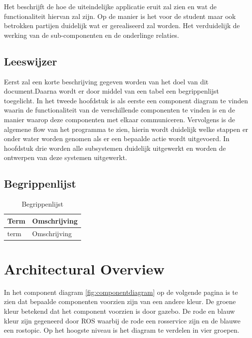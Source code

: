 \documentclass[a4paper, 11pt, oneside]{report}
\begin{document}
Het beschrijft de hoe de uiteindelijke applicatie eruit zal zien en wat de functionaliteit hiervan zal zijn. Op de manier is het voor de student maar ook betrokken partijen duidelijk wat er gerealiseerd zal worden. Het verduidelijk de werking van de sub-componenten en de onderlinge relaties. 

\section{Leeswijzer}
\label{inleiding:beschrijving:leeswijzer}
Eerst zal een korte beschrijving gegeven worden van het doel van dit document.Daarna wordt er door middel van een tabel een begrippenlijst toegelicht. In het tweede hoofdstuk is als eerste een component diagram te vinden waarin de functionaliteit van de verschillende componenten te vinden is en de manier waarop deze componenten met elkaar communiceren. Vervolgens is de algemene flow van het programma te zien, hierin wordt duidelijk welke stappen er onder water worden genomen als er een bepaalde actie wordt uitgevoerd. In hoofdstuk drie worden alle subsystemen duidelijk uitgewerkt en worden de ontwerpen van deze systemen uitgewerkt. 
\section{Begrippenlijst}
\label{inleiding:begrippenlijst}

\begin{table}[H]
\centering

\label{begrippen}
\begin{tabular}{|l|l|}
\hline
\rowcolor[HTML]{C0C0C0}
Term        & Omschrijving                                                         \\ \hline
term        & Omschrijving                                                      	\\ \hline

\end{tabular}
\caption{Begrippenlijst}
\end{table}

\chapter{Architectural Overview}
\label{architectural}
In het component diagram \autoref{fig:componentdiagram} op de volgende pagina is te zien dat bepaalde componenten voorzien zijn van een andere kleur. 
De groene kleur betekend dat het component voorzien is door gazebo.
De rode en blauw kleur zijn gegeneerd door ROS waarbij de rode een rosservice zijn en de blauwe een rostopic.
Op het hoogste niveau is het diagram te verdelen in vier groepen.
\end{document}
